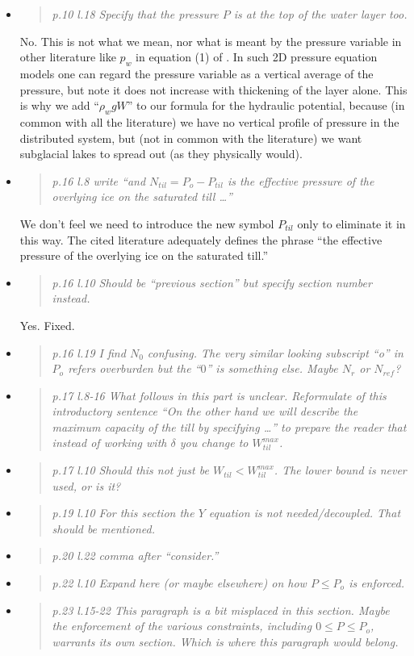 \documentclass[11pt,reqno]{amsart}
\newcommand{\reply}[2]{
\medskip\medskip
\item  \begin{quote}
\emph{#1}
\end{quote}

\medskip
\noindent #2}
\begin{document}
\begin{itemize}
\reply{p.10 l.18 Specify that the pressure $P$ is at the top of the water layer too.}
{No.  This is not what we mean, nor what is meant by the pressure variable in other literature like $p_w$ in equation (1) of \cite{Werderetal2013}.  In such 2D pressure equation models one can regard the pressure variable as a vertical average of the pressure, but note it does not increase with thickening of the layer alone.  This is why we add ``$\rho_w g W$'' to our formula for the hydraulic potential, because (in common with all the literature) we have no vertical profile of pressure in the distributed system, but (not in common with the literature) we want subglacial lakes to spread out (as they physically would).}

\reply{p.16 l.8 write ``and $N_{til} = P_o-P_{til}$ is the effective pressure of the overlying ice on the saturated till \dots''}
{We don't feel we need to introduce the new symbol $P_{til}$ only to eliminate it in this way.  The cited literature adequately defines the phrase ``the effective pressure of the overlying ice on the saturated till.''}

\reply{p.16 l.10 Should be ``previous section'' but specify section number instead.}
{Yes.  Fixed.}

\reply{p.16 l.19 I find $N_0$ confusing. The very similar looking subscript ``o'' in $P_o$ refers overburden but the ``$0$'' is something else. Maybe $N_r$ or $N_{ref}$?}
{}

\reply{p.17 l.8-16 What follows in this part is unclear. Reformulate of this introductory sentence ``On the other hand we will describe the maximum capacity of the till by specifying \dots'' to prepare the reader that instead of working with $\delta$ you change to $W_{til}^{max}$.}
{}

\reply{p.17 l.10 Should this not just be $W_{til} < W_{til}^{max}$.  The lower bound is never used, or is it?}
{}

\reply{p.19 l.10 For this section the $Y$ equation is not needed/decoupled. That should be
mentioned.}
{}

\reply{p.20 l.22 comma after ``consider.''}
{}

\reply{p.22 l.10 Expand here (or maybe elsewhere) on how $P \le P_o$ is enforced.}
{}

\reply{p.23 l.15-22 This paragraph is a bit misplaced in this section.  Maybe the enforcement of the various constraints, including $0 \le P \le P_o$, warrants its own section.  Which is where this paragraph would belong.}
{}


\end{itemize}
\end{document}
